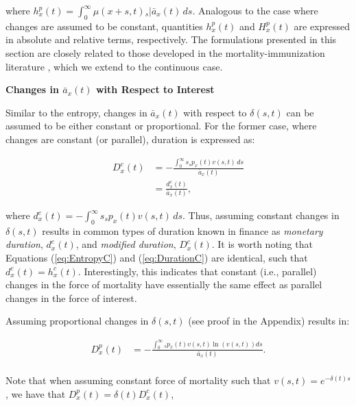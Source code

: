 \documentclass[12pt]{article}
\begin{document}
where ${h}^{p}_{x}(t)=\int_0^\infty \mu(x+s,t)   {}_s|\bar{a}_x(t) \, ds$. Analogous to the case where changes are assumed to be constant, quantities ${h}^{p}_{x}(t)$ and ${H}^{p}_{x}(t)$ are expressed in absolute and relative terms, respectively. The formulations presented in this section are closely related to those developed in the mortality-immunization literature \citep{Tsai2013a,Lin2020}, which we extend to the continuous case.



{\textbf{{Changes in $\bar{a}_x(t)$ with Respect to Interest}}


Similar to the entropy, changes in $\bar{a}_x(t)$ with respect to $\delta(s,t)$ can be assumed to be either constant or proportional. For the former case, where changes are constant (or parallel), duration is expressed as:

\begin{equation}\label{eq:DurationC}
	\begin{split}
		{D}^{c}_x(t) &= -\frac{\int_0^\infty s {}_s p_x(t) {v}(s,t) \, ds}{\bar{a}_x(t)} \\
		&= \frac{{d}^{c}_x(t)}{\bar{a}_x(t)},
	\end{split}
\end{equation}

where ${d}^{c}_x(t) = -\int_0^\infty s {}_s p_x(t) {v}(s,t) \, ds$. Thus, assuming constant changes in $\delta(s,t)$ results in common types of duration known in finance as \textit{monetary duration}, ${d}^{c}_x(t)$, and \textit{modified duration}, ${D}^{c}_x(t)$. It is worth noting that Equations (\ref{eq:EntropyC}) and (\ref{eq:DurationC}) are identical, such that ${d}^{c}_x(t) = {h}^{c}_{x}(t)$. Interestingly, this indicates that constant (i.e., parallel) changes in the force of mortality have essentially the same effect as parallel changes in the force of interest.

Assuming proportional changes in $\delta(s,t)$ (see proof in the Appendix) results in: 


\begin{equation}\label{eq:DurationP}
\begin{split}
{D}^{p}_{x}(t) &= -\frac{\int_0^\infty {}_sp_x(t) v(s,t) \ln(v(s,t))ds}{\bar{a}_x(t)}. \\
\end{split}
\end{equation}


Note that when assuming constant force of mortality such that $v(s,t)=e^{-\delta(t)s}$, we have that ${D}^{p}_{x}(t)=\delta(t){D}^{c}_{x}(t)$,


}
\end{document}
